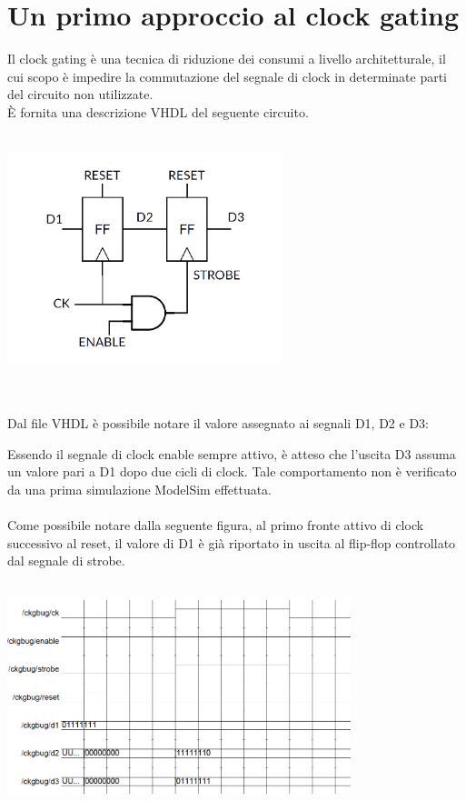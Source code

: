 \documentclass[11pt,  english, makeidx, a4paper, titlepage, oneside]{book}
\newenvironment{listato}{\footnotesize} {\normalsize }
\begin{document}
\section{Un primo approccio al clock gating}
Il clock gating è una tecnica di riduzione dei consumi a livello architetturale, il cui scopo è impedire la commutazione del segnale di clock in determinate parti del circuito non utilizzate.
\\
È fornita una descrizione VHDL del seguente circuito.
\\\\
\centerline{\includegraphics[width=8cm]{./img/Lab_3/circuito_clk_bug.png}}
\\\\
Dal file VHDL è possibile notare il valore assegnato ai segnali D1, D2 e D3:
\begin{center}
\begin{listato}
	\centerline{}
\end{listato}
\end{center}
\vspace{0.3cm}
Essendo il segnale di clock enable sempre attivo, è atteso che l'uscita D3 assuma un valore pari a D1 dopo due cicli di clock. Tale comportamento non è verificato da una prima simulazione ModelSim effettuata.
\\\\
Come possibile notare dalla seguente figura, al primo fronte attivo di clock successivo al reset, il valore di D1 è già riportato in uscita al flip-flop controllato dal segnale di strobe.
\\\\
\centerline{\includegraphics[width=10cm]{./img/Lab_3/clk_bug.png}}
\end{document}
